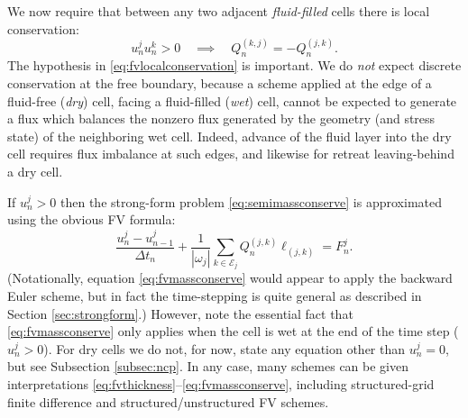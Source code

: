 \documentclass[final,onefignum]{siamart190516}
\begin{document}
We now require that between any two adjacent \emph{fluid-filled} cells there is local conservation:
\begin{equation}
  u_n^j u_n^k > 0 \quad \implies \quad Q_n^{(k,j)}=-Q_n^{(j,k)}.  \label{eq:fvlocalconservation}
\end{equation}
The hypothesis in \eqref{eq:fvlocalconservation} is important.  We do \emph{not} expect discrete conservation at the free boundary, because a scheme applied at the edge of a fluid-free (\emph{dry}) cell, facing a fluid-filled (\emph{wet}) cell, cannot be expected to generate a flux which balances the nonzero flux generated by the geometry (and stress state) of the neighboring wet cell.  Indeed, advance of the fluid layer into the dry cell requires flux imbalance at such edges, and likewise for retreat leaving-behind a dry cell.

If $u_n^j>0$ then the strong-form problem \eqref{eq:semimassconserve} is approximated using the obvious FV formula:
\begin{equation}
\frac{u_n^j - u_{n-1}^j}{\Delta t_n} + \frac{1}{|\omega_j|} \sum_{k\in \mathcal{E}_j} Q_n^{(j,k)} \ell_{(j,k)} = F_n^j. \label{eq:fvmassconserve}
\end{equation}
(Notationally, equation \eqref{eq:fvmassconserve} would appear to apply the backward Euler scheme, but in fact the time-stepping is quite general as described in Section \ref{sec:strongform}.)  However, note the essential fact that \eqref{eq:fvmassconserve} only applies when the cell is wet at the end of the time step ($u_n^j>0$).  For dry cells we do not, for now, state any equation other than $u_n^j=0$, but see Subsection \ref{subsec:ncp}.  In any case, many schemes can be given interpretations \eqref{eq:fvthickness}--\eqref{eq:fvmassconserve}, including structured-grid finite difference \cite{Bueler2016} and structured/unstructured FV \cite{LeVeque2002} schemes.
\end{document}
